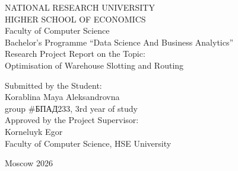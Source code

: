 \documentclass[12pt,a4paper]{article}
\begin{document}
\begin{titlepage}
  \begin{center}
    NATIONAL RESEARCH UNIVERSITY\\
    HIGHER SCHOOL OF ECONOMICS\\[1em]
    Faculty of Computer Science\\
    Bachelor's Programme ``Data Science And Business Analytics''\\[4em]

    Research Project Report on the Topic:\\[1em]
    Optimisation of Warehouse Slotting and Routing\\[5em]

    \begin{flushleft}
      Submitted by the Student:\\[0.5em]
      Korablina Maya Aleksandrovna\\
      group \#БПАД233, 3rd year of study\\[2em]

      Approved by the Project Supervisor:\\[0.5em]
      Korneluyk Egor\\
      Faculty of Computer Science, HSE University
    \end{flushleft}

    \vfill
    Moscow 2026
  \end{center}
\end{titlepage}
\end{document}
